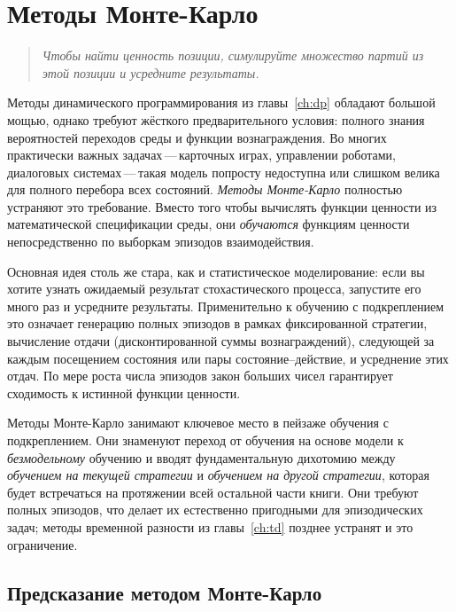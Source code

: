 \chapter{Методы Монте-Карло}
\label{ch:mc}

\begin{quote}
\itshape
Чтобы найти ценность позиции, симулируйте множество партий из этой позиции и усредните результаты.
\end{quote}

\bigskip

Методы динамического программирования из главы~\ref{ch:dp} обладают большой мощью, однако требуют жёсткого предварительного условия: полного знания вероятностей переходов среды и функции вознаграждения.  Во многих практически важных задачах\,---\,карточных играх, управлении роботами, диалоговых системах\,---\,такая модель попросту недоступна или слишком велика для полного перебора всех состояний.  \emph{Методы Монте-Карло} полностью устраняют это требование.  Вместо того чтобы вычислять функции ценности из математической спецификации среды, они \emph{обучаются} функциям ценности непосредственно по выборкам эпизодов взаимодействия.

Основная идея столь же стара, как и статистическое моделирование: если вы хотите узнать ожидаемый результат стохастического процесса, запустите его много раз и усредните результаты.  Применительно к обучению с подкреплением это означает генерацию полных эпизодов в рамках фиксированной стратегии, вычисление отдачи (дисконтированной суммы вознаграждений), следующей за каждым посещением состояния или пары состояние--действие, и усреднение этих отдач.  По мере роста числа эпизодов закон больших чисел гарантирует сходимость к истинной функции ценности.

Методы Монте-Карло занимают ключевое место в пейзаже обучения с подкреплением.  Они знаменуют переход от обучения на основе модели к \emph{безмодельному} обучению и вводят фундаментальную дихотомию между \emph{обучением на текущей стратегии} и \emph{обучением на другой стратегии}, которая будет встречаться на протяжении всей остальной части книги.  Они требуют полных эпизодов, что делает их естественно пригодными для эпизодических задач; методы временной разности из главы~\ref{ch:td} позднее устранят и это ограничение.


\section{Предсказание методом Монте-Карло}
\label{sec:mc-prediction}

